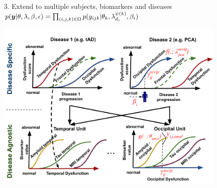 \documentclass[portrait,a0,final,20pt]{a0poster}
\newcommand{\fnt}[1]{\LARGE{#1}}
\begin{document}
{\begin{multicols}{2}
\begin{figure}[H]
 \end{figure}

 
 













\begin{figure}[H]
 \centering
  \fnt{3. Extend to multiple subjects, biomarkers and diseases}\\
 $ p(\boldsymbol{y}|\theta, \lambda, \beta , \epsilon) = \prod_{(i,j,k) \in \Omega} p(y_{ijk}|\theta_k, \lambda_{d_i}^{\psi(k)}, \beta_{i}) $
 
 \includegraphics[width=\columnwidth]{../figures/disease_knowledge_transfer_symbols.pdf}
\end{figure}




\end{multicols}}
\end{document}
